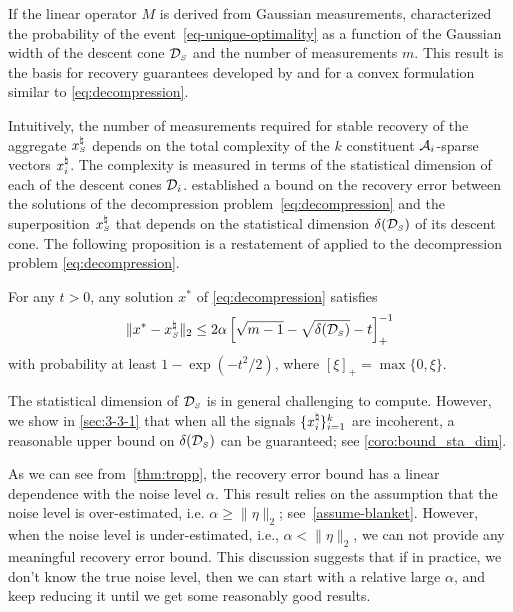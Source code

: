 If the linear operator $M$ is derived from Gaussian measurements, \citet{gordon1988milman} characterized the probability of the event~\eqref{eq-unique-optimality} as a function of the Gaussian width of the descent cone $\mathcal{D}_{\scriptscriptstyle S}$ and the number of measurements $m$. This result is the basis for recovery guarantees developed by \citet{chandrasekaran2012convex} and \citet{tropp2015convex} for a convex formulation similar to \eqref{eq:decompression}.

Intuitively, the number of measurements required for stable recovery of the aggregate $x_{\scriptscriptstyle S}^\natural$ depends on the total complexity of the $k$ constituent $\mathcal{A}_i$-sparse vectors $x_i^{\natural}$. The complexity is measured in terms of the statistical dimension of each of the descent cones $\mathcal{D}_i$.
\citet{tropp2015convex} established a bound on the recovery error between the solutions of the decompression problem~\eqref{eq:decompression} and the superposition $x_{\scriptscriptstyle S}^{\natural}$ that depends on the statistical dimension $\delta(\mathcal{D}_{\scriptscriptstyle S})$ of its descent cone. The following proposition is a restatement of \citep[Corollary~3.5]{tropp2015convex} applied to the decompression problem \eqref{eq:decompression}.

\begin{proposition}%
    \label{thm:tropp}
    For any $t>0$, any solution $x^*$ of \eqref{eq:decompression} satisfies
    \begin{equation*}
        \|x^* - x_{\scriptscriptstyle S}^\natural\|_2 \leq 2\alpha\left[\sqrt{m - 1} - \sqrt{\delta(\mathcal{D}_{\scriptscriptstyle S})} - t\right]_+^{-1}
    \end{equation*}
    with probability at least $1 - \exp(-t^2/2)$, where $[\xi]_+=\max\{0,\xi\}$. 
\end{proposition}

The statistical dimension of $\mathcal{D}_{\scriptscriptstyle S}$ is in general challenging to compute. However, we show in \autoref{sec:3-3-1} that when all the signals $\{x_i^{\natural}\}_{i=1}^k$ are incoherent, a reasonable upper bound on $\delta(\mathcal{D}_{\scriptscriptstyle S})$ can be guaranteed; see \autoref{coro:bound_sta_dim}.

As we can see from~\autoref{thm:tropp}, the recovery error bound has a linear dependence with the noise level $\alpha$. This result relies on the assumption that the noise level is over-estimated, i.e. $\alpha \geq \|\eta\|_2$; see~\autoref{assume-blanket}. However, when the noise level is under-estimated, i.e., $\alpha < \|\eta\|_2$, we can not provide any meaningful recovery error bound. This discussion suggests that if in practice, we don't know the true noise level, then we can start with a relative large $\alpha$, and keep reducing it until we get some reasonably good results.

